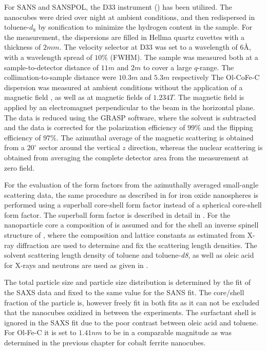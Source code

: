 \documentclass[\main/dresen_thesis.tex]{subfiles}
\begin{document}
    For SANS and SANSPOL, the D33 instrument () has been utilized.
    The nanocubes were dried over night at ambient conditions, and then redispersed in toluene-$\mathit{d_8}$ by sonification to minimize the hydrogen content in the sample.
    For the measurement, the dispersions are filled in Hellma quartz cuvettes with a thickness of $2 \unit{mm}$.
    The velocity selector at D33 was set to a wavelength of $6 \unit{\angstrom}$, with a wavelength spread of $10 \%$ (FWHM).
    The sample was measured both at a sample-to-detector distance of $11 \unit{m}$ and $2 \unit{m}$ to cover a large $q$-range.
    The collimation-to-sample distance were $10.3 \unit{m}$ and $5.3 \unit{m}$ respectively
    The Ol-CoFe-C dispersion was measured at ambient conditions without the application of a magnetic field , as well as at magnetic fields of $1.234 \unit{T}$. %
    The magnetic field is applied by an electromagnet perpendicular to the beam in the horizontal plane.
    The data is reduced using the GRASP software, where the solvent is subtracted and the data is corrected for the polarization efficiency of $99 \%$ and the flipping efficiency of $97 \%$.
    The azimuthal average of the magnetic scattering is obtained from a $20 ^\circ$ sector around the vertical $z$ direction, whereas the nuclear scattering is obtained from averaging the complete detector area from the measurement at zero field.

    For the evaluation of the form factors from the azimuthally averaged small-angle scattering data, the same procedure as described in  for iron oxide nanospheres is performed using a superball core-shell form factor instead of a spherical core-shell form factor.
    The superball form factor is described in detail in .
    For the nanoparticle core a composition of  is assumed and for the shell an inverse spinell structure of , where the composition and lattice constants as estimated from X-ray diffraction are used to determine and fix the scattering length densities.
    The solvent scattering length density of toluene and toluene-\textit{d8}, as well as oleic acid for X-rays and neutrons are used as given in .
    
    The total particle size and particle size distribution is determined by the fit of the SAXS data and fixed to the same value for the SANS fit.
    The core/shell fraction of the particle is, however freely fit in both fits as it can not be excluded that the nanocubes oxidized in between the experiments.
    The surfactant shell is ignored in the SAXS fit due to the poor contrast between oleic acid and toluene. For Ol-Fe-C it is set to $1.41 \unit{nm}$ to be in a comparable magnitude as was determined in the previous chapter  for cobalt ferrite nanocubes.
\end{document}

